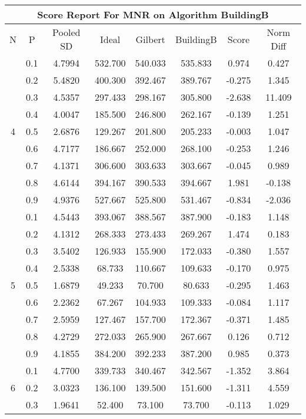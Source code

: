 \documentclass[11pt,a4paper]{report}
\begin{document}
\begin{longtable}{ | c | c || c | c | c | c | c | c | }
\hline
\multicolumn{8}{|c|}{ Score Report For MNR on Algorithm BuildingB} \\
\hline
N & P & Pooled SD &  Ideal &  Gilbert & BuildingB  & Score & Norm Diff \\
 \hline
 \hline
 \endhead
\multirow{9}{*}{4} & 0.1 & 4.7994 & 532.700 & 540.033 & 535.833 & 0.974 & 0.427 \\
 & 0.2 & 5.4820 & 400.300 & 392.467 & 389.767 & -0.275 & 1.345 \\
 & 0.3 & 4.5357 & 297.433 & 298.167 & 305.800 & -2.638 & 11.409 \\
 & 0.4 & 4.0047 & 185.500 & 246.800 & 262.167 & -0.139 & 1.251 \\
 & 0.5 & 2.6876 & 129.267 & 201.800 & 205.233 & -0.003 & 1.047 \\
 & 0.6 & 4.7177 & 186.667 & 252.000 & 268.100 & -0.253 & 1.246 \\
 & 0.7 & 4.1371 & 306.600 & 303.633 & 303.667 & -0.045 & 0.989 \\
 & 0.8 & 4.6144 & 394.167 & 390.533 & 394.667 & 1.981 & -0.138 \\
 & 0.9 & 4.9376 & 527.667 & 525.800 & 531.467 & -0.834 & -2.036 \\
 \hline
\multirow{9}{*}{5} & 0.1 & 4.5443 & 393.067 & 388.567 & 387.900 & -0.183 & 1.148 \\
 & 0.2 & 4.1312 & 268.333 & 273.433 & 269.267 & 1.474 & 0.183 \\
 & 0.3 & 3.5402 & 126.933 & 155.900 & 172.033 & -0.380 & 1.557 \\
 & 0.4 & 2.5338 & 68.733 & 110.667 & 109.633 & -0.170 & 0.975 \\
 & 0.5 & 1.6879 & 49.233 & 70.700 & 80.633 & -0.295 & 1.463 \\
 & 0.6 & 2.2362 & 67.267 & 104.933 & 109.333 & -0.084 & 1.117 \\
 & 0.7 & 2.5959 & 127.467 & 157.700 & 172.367 & -0.371 & 1.485 \\
 & 0.8 & 4.2729 & 272.033 & 265.900 & 267.667 & 0.126 & 0.712 \\
 & 0.9 & 4.1855 & 384.200 & 392.233 & 387.200 & 0.985 & 0.373 \\
 \hline
\multirow{9}{*}{6} & 0.1 & 4.7700 & 339.733 & 340.467 & 342.567 & -1.352 & 3.864 \\
 & 0.2 & 3.0323 & 136.100 & 139.500 & 151.600 & -1.311 & 4.559 \\
 & 0.3 & 1.9641 & 52.400 & 73.100 & 73.700 & -0.113 & 1.029 \\

\end{longtable}
\end{document}
